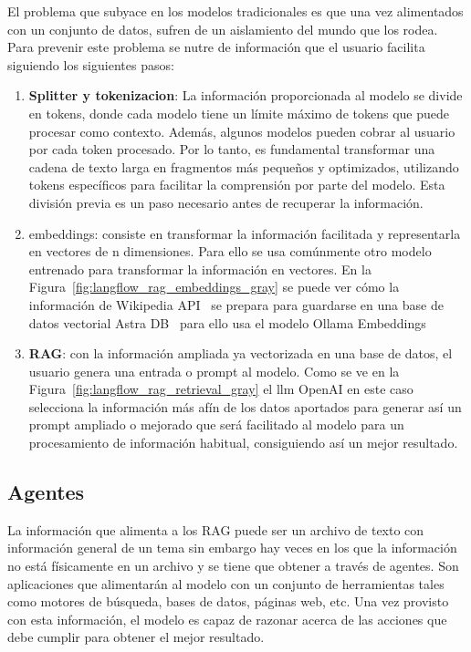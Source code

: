 	El problema que subyace en los modelos tradicionales es que una vez alimentados con un conjunto de datos, sufren de un aislamiento del mundo que los rodea. Para prevenir este problema se nutre de información que el usuario facilita siguiendo los siguientes pasos:
	\begin{enumerate}
		\item \textbf{Splitter y \gls{tokenizacion}}: La información proporcionada al modelo se divide en tokens, donde cada modelo tiene un límite máximo de tokens que puede procesar como contexto. Además, algunos modelos pueden cobrar al usuario por cada token procesado. Por lo tanto, es fundamental transformar una cadena de texto larga en fragmentos más pequeños y optimizados, utilizando tokens específicos para facilitar la comprensión por parte del modelo. Esta división previa es un paso necesario antes de recuperar la información.

		\item \gls{embeddings}: consiste en transformar la información facilitada y representarla en vectores de n dimensiones. Para ello se usa comúnmente otro modelo entrenado para transformar la información en vectores.
		En la Figura~\ref{fig:langflow_rag_embeddings_gray} se puede ver cómo la información de Wikipedia API~\cite{wikimedia_api} se prepara para guardarse en una base de datos vectorial Astra DB~\cite{datastax_astra} para ello usa el modelo Ollama Embeddings


		\item \textbf{RAG}: con la información ampliada ya vectorizada en una base de datos, el usuario genera una entrada o prompt al modelo. Como se ve en la Figura~\ref{fig:langflow_rag_retrieval_gray} el \acrshort{llm} OpenAI en este caso selecciona la información más afín de los datos aportados para generar así un prompt ampliado o mejorado que será facilitado al modelo para un procesamiento de información habitual, consiguiendo así un mejor resultado.

	\end{enumerate}

	\subsection{Agentes}
	\label{sec:agentes}
	La información que alimenta a los RAG puede ser un archivo de texto con información general de un tema sin embargo hay veces en los que la información no está físicamente en un archivo y se tiene que obtener a través de \gls{agentes}.
	Son aplicaciones que alimentarán al modelo con un conjunto de herramientas tales como motores de búsqueda, bases de datos, páginas web, etc. Una vez provisto con esta información, el modelo es capaz de razonar acerca de las acciones que debe cumplir para obtener el mejor resultado.


